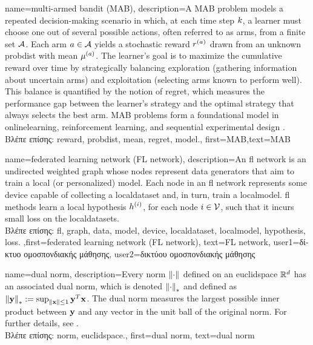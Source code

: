 {name={multi-armed bandit (MAB)},
	description={A MAB problem models 
		a repeated decision-making scenario in which, at each time step $k$, a learner must 
		choose one out of several possible actions, often referred to as arms, from a finite 
		set $\mathcal{A}$. Each arm $a \in \mathcal{A}$ yields a stochastic \gls{reward} $r^{(a)}$ 
		drawn from an unknown \gls{probdist} with \gls{mean} $\mu^{(a)}$. 
		The learner’s goal is to maximize the cumulative \gls{reward} over time by 
		strategically balancing exploration (gathering information about 
		uncertain arms) and exploitation (selecting arms known to perform well). 
		This balance is quantified by the notion of \gls{regret}, which measures the performance 
		gap between the learner's strategy and the optimal strategy that always selects the best arm. 
		MAB problems form a foundational \gls{model} in \gls{onlinelearning}, reinforcement learning, 
		and sequential experimental design \cite{Bubeck2012}.\\
		\foreignlanguage{greek}{Βλέπε επίσης:} \gls{reward}, \gls{probdist}, \gls{mean}, \gls{regret}, \gls{model}.},
	first={MAB},text={MAB}
}

{name={federated learning network (FL network)},
	description={An \gls{fl} network is an 
		undirected weighted \gls{graph} whose nodes represent \gls{data} generators that 
		aim to train a local (or personalized) \gls{model}. Each node in an \gls{fl} network 
		represents some \gls{device} capable of collecting a \gls{localdataset} 
		and, in turn, train a \gls{localmodel}. \Gls{fl} methods learn a local \gls{hypothesis} $h^{(i)}$, for 
	    each node $i \in \mathcal{V}$, such that it incurs small \gls{loss} on the \gls{localdataset}s.\\
	    \foreignlanguage{greek}{Βλέπε επίσης:} \gls{fl}, \gls{graph}, \gls{data}, \gls{model}, \gls{device}, \gls{localdataset}, \gls{localmodel}, \gls{hypothesis}, \gls{loss}.
	    },first={federated learning network (FL network)},
	    text={FL network},
	    user1={\foreignlanguage{greek}{δίκτυο ομοσπονδιακής μάθησης}}, %
  	    user2={\foreignlanguage{greek}{δικτύου ομοσπονδιακής μάθησης}} %
}

{name={dual norm},
	description={Every \gls{norm} $\left\Vert {\cdot} \right\Vert_{}$ defined on an \gls{euclidspace} $\mathbb{R}^{d}$ 
		has an associated dual \gls{norm}, which is denoted $\left\Vert {\cdot} \right\Vert_{*}$ and defined as 
		$\left\Vert {{\bf y}} \right\Vert_{*} := \sup_{\Vert {{\bf x}} \Vert{} \le 1} {\bf y}^{T} {\bf x}$. 
		The dual \gls{norm} measures the largest possible inner product between ${\bf y}$ 
		and any vector in the unit ball of the original \gls{norm}. For further details, see 
		\cite[Sec.~A.1.6]{BoydConvexBook}.\\
		\foreignlanguage{greek}{Βλέπε επίσης:} \gls{norm}, \gls{euclidspace}.},
	first={dual norm},
	text={dual norm}
}

